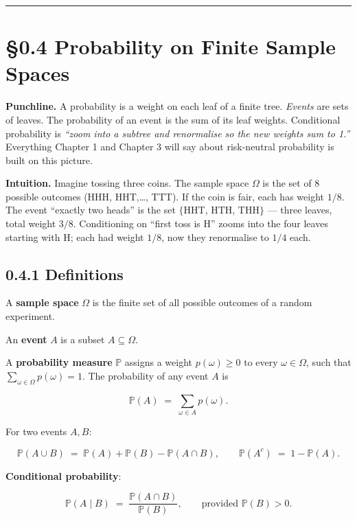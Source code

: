 \documentclass[
  10pt,
  twoside]{book}
\begin{document}
\begin{center}\rule{0.5\linewidth}{0.5pt}\end{center}

\section{§0.4 Probability on Finite Sample
Spaces}\label{probability-on-finite-sample-spaces}

\textbf{Punchline.} A probability is a weight on each leaf of a finite
tree. \emph{Events} are sets of leaves. The probability of an event is
the sum of its leaf weights. Conditional probability is \emph{``zoom
into a subtree and renormalise so the new weights sum to 1.''}
Everything Chapter 1 and Chapter 3 will say about risk-neutral
probability is built on this picture.

\textbf{Intuition.} Imagine tossing three coins. The sample space
\(\Omega\) is the set of 8 possible outcomes (HHH, HHT,\ldots, TTT). If
the coin is fair, each has weight \(1/8\). The event ``exactly two
heads'' is the set \(\{\)HHT, HTH, THH\(\}\) --- three leaves, total
weight \(3/8\). Conditioning on ``first toss is H'' zooms into the four
leaves starting with H; each had weight \(1/8\), now they renormalise to
\(1/4\) each.

\subsection{0.4.1 Definitions}\label{definitions-1}

A \textbf{sample space} \(\Omega\) is the finite set of all possible
outcomes of a random experiment.

An \textbf{event} \(A\) is a subset \(A \subseteq \Omega\).

A \textbf{probability measure} \(\mathbb{P}\) assigns a weight
\(p(\omega) \geq 0\) to every \(\omega \in \Omega\), such that
\(\sum_{\omega \in \Omega} p(\omega) = 1\). The probability of any event
\(A\) is

\[\mathbb{P}(A) \;=\; \sum_{\omega \in A} p(\omega).\]

For two events \(A, B\):

\[\mathbb{P}(A \cup B) \;=\; \mathbb{P}(A) + \mathbb{P}(B) - \mathbb{P}(A \cap B), \qquad \mathbb{P}(A^c) \;=\; 1 - \mathbb{P}(A).\]

\textbf{Conditional probability}:

\[\mathbb{P}(A \mid B) \;=\; \frac{\mathbb{P}(A \cap B)}{\mathbb{P}(B)}, \qquad \text{provided } \mathbb{P}(B) > 0.\]
\end{document}
